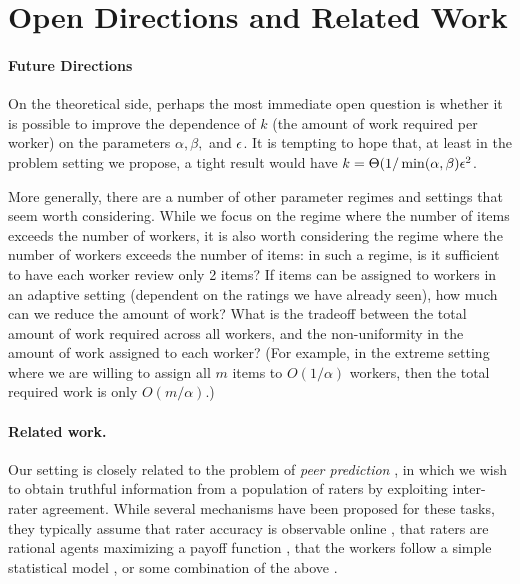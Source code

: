 \section{Open Directions and Related Work}
\label{sec:discussion}
\iffalse
\todo{fill in with lower bounds and conjectures that explain what 
``best possible'' result would look like, and how adversarial and 
stochastic settings compare}\fi

\paragraph{Future Directions}
On the theoretical side, perhaps the most immediate open question is whether it is possible to improve the dependence of $k$ (the amount of work required per worker) on the parameters $\alpha, \beta,$ and $\epsilon$.  It is tempting to hope that, at least in the problem setting we propose, a tight result would have $k = \Theta(1/\min (\alpha,\beta)\epsilon^2$.   

More generally, there are a number of other parameter regimes and settings that seem worth considering.  While we focus on the regime where the number of items exceeds the number of workers, it is also worth considering the regime where the number of workers exceeds the number of items:  in such a regime, is it sufficient to have each worker review only 2 items?  If items can be assigned to workers in an adaptive setting (dependent on the ratings we have already seen), how much can we reduce the amount of work?  What is the tradeoff between the total amount of work required across all workers, and the non-uniformity in the amount of work assigned to each worker?  (For example, in the extreme setting where we  are willing to assign all $m$ items to $O(1/\alpha)$ workers, then the total required work is only $O(m/\alpha)$.)



\paragraph{Related work.}
Our setting is closely related to the problem of \emph{peer prediction} 
\citep{miller2005eliciting}, in which we wish to obtain truthful information 
from a population of raters by exploiting inter-rater agreement. 
While several mechanisms have been proposed for these tasks, 
they typically assume that rater accuracy is observable online
\citep{resnick2007influence}, that raters are 
rational agents maximizing a payoff function \citep{dasgupta2013crowdsourced,
kamble2015truth,shnayder2016strong}, that the workers follow a simple 
statistical model \citep{karger2014budget,zhang2014crowdsourcing,
zhou2015regularized}, or some combination of the above \citep{shah2015double,
shah2015approval}. 

